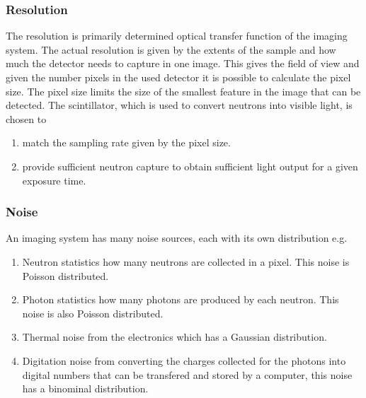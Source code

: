\documentclass[letterpaper,10pt,english]{sphinxmanual}
\begin{document}
\subsubsection{Resolution}
\label{\detokenize{ML4NeutronImageSegmentation:resolution}}
The resolution is primarily determined optical transfer function of the imaging system. The actual resolution is given by the extents of the sample and how much the detector needs to capture in one image. This gives the field of view and given the number pixels in the used detector it is possible to calculate the pixel size. The pixel size limits the size of the smallest feature in the image that can be detected. The scintillator, which is used to convert neutrons into visible light, is chosen to
\begin{enumerate}
%
\item {} 
match the sampling rate given by the pixel size.

\item {} 
provide sufficient neutron capture to obtain sufficient light output for a given exposure time.

\end{enumerate}


\subsubsection{Noise}
\label{\detokenize{ML4NeutronImageSegmentation:noise}}
An imaging system has many noise sources, each with its own distribution e.g.
\begin{enumerate}
%
\item {} 
Neutron statistics \sphinxhyphen{} how many neutrons are collected in a pixel. This noise is Poisson distributed.

\item {} 
Photon statistics \sphinxhyphen{} how many photons are produced by each neutron. This noise is also Poisson distributed.

\item {} 
Thermal noise from the electronics which has a Gaussian distribution.

\item {} 
Digitation noise from converting the charges collected for the photons into digital numbers that can be transfered and stored by a computer, this noise has a binominal distribution.

\end{enumerate}
\end{document}
